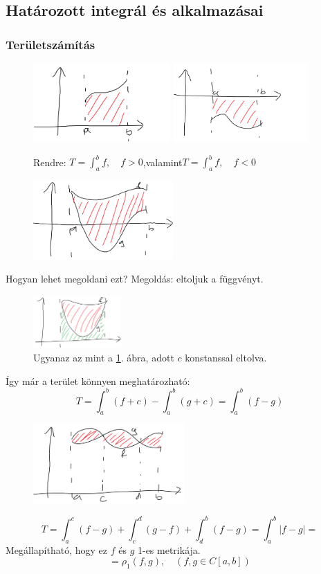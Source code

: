 \documentclass[a4paper,11.5pt]{article}
\begin{document}
	\subsection{Határozott integrál és alkalmazásai}
	\subsubsection{Területszámítás}
		\begin{figure}[H]
			\centering
			\includegraphics[height=3cm]{../2zh/kepek/01.png}
			\includegraphics[height=3cm]{../2zh/kepek/02.png}
			\caption{Rendre: $T=\int_a^bf,\quad f>0$,\quad valamint\quad  $T=\int_a^bf,\quad f<0$}
		\end{figure}
		\begin{figure}[H]
			\centering
			\includegraphics[height=3cm]{../2zh/kepek/03.png}
			\caption{}\label{eltolatlan-fv}
		\end{figure}
		Hogyan lehet megoldani ezt? Megoldás: eltoljuk a függvényt.
		\begin{figure}[H]
			\centering
			\includegraphics[height=2cm]{../2zh/kepek/04.png}
			\caption{Ugyanaz az mint a \ref{eltolatlan-fv}. ábra, adott $c$ konstanssal eltolva.}
		\end{figure}
		Így már a terület könnyen meghatározható:
		\[ T=\int_a^b(f+c)-\int_a^b(g+c)=\int_a^b(f-g) \]
		\begin{figure}[H]
			\centering
			\includegraphics[height=3cm]{../2zh/kepek/05.png}
			\caption{}
		\end{figure}
		\[ T=\int_a^c(f-g)+\int_c^d(g-f)+\int_d^b(f-g)=\int_a^b|f-g|= \]
		Megállapítható, hogy ez $f$ és $g$ 1-es metrikája.
		\[ =\rho_1(f,g),\quad (f,g\in C[a,b]) \]
		
\end{document}
